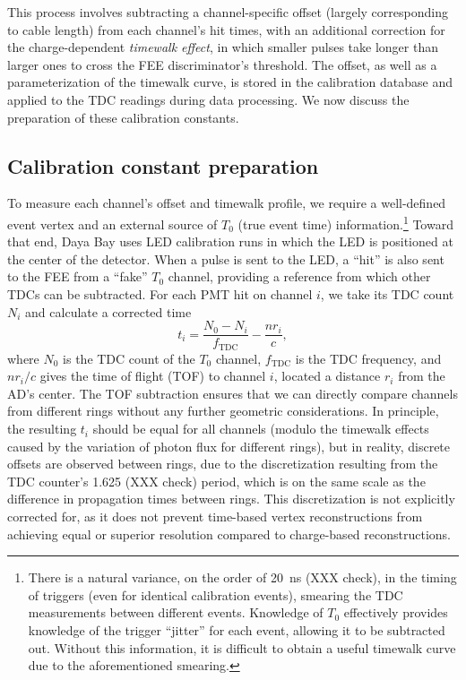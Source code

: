 \documentclass[../thesis.tex]{subfiles}
\begin{document}
This process involves subtracting a channel-specific offset (largely
corresponding to cable length) from each channel's hit times, with an additional
correction for the charge-dependent \emph{timewalk effect}, in which smaller
pulses take longer than larger ones to cross the FEE discriminator's
threshold. The offset, as well as a parameterization of the timewalk curve, is
stored in the calibration database and applied to the TDC readings during data
processing. We now discuss the preparation of these calibration constants.

\subsection{Calibration constant preparation}

To measure each channel's offset and timewalk profile, we require a well-defined
event vertex and an external source of $T_0$ (true event time)
information.\footnote{There is a natural variance, on the order of 20~ns (XXX
  check), in the timing of triggers (even for identical calibration events),
  smearing the TDC measurements between different events. Knowledge of $T_0$
  effectively provides knowledge of the trigger ``jitter'' for each event,
  allowing it to be subtracted out. Without this information, it is difficult to
  obtain a useful timewalk curve due to the aforementioned smearing.} Toward
that end, Daya Bay uses LED calibration runs in which the LED is positioned at
the center of the detector. When a pulse is sent to the LED, a ``hit'' is also
sent to the FEE from a ``fake'' $T_0$ channel, providing a reference from which
other TDCs can be subtracted. For each PMT hit on channel $i$, we take its TDC
count $N_i$ and calculate a corrected time
\begin{equation*}
  t_i = \frac{N_0 - N_i}{f_\mathrm{TDC}} - \frac{n r_i}{c},  
\end{equation*}
where $N_0$ is the TDC count of the $T_0$ channel, $f_\mathrm{TDC}$ is the TDC
frequency, and $nr_i/c$ gives the time of flight (TOF) to channel $i$, located a
distance $r_i$ from the AD's center. The TOF subtraction ensures that we can
directly compare channels from different rings without any further geometric
considerations. In principle, the resulting $t_i$ should be equal for all
channels (modulo the timewalk effects caused by the variation of photon flux for
different rings), but in reality, discrete offsets are observed between rings,
due to the discretization resulting from the TDC counter's 1.625 (XXX check)
period, which is on the same scale as the difference in propagation times
between rings. This discretization is not explicitly corrected for, as it does
not prevent time-based vertex reconstructions from achieving equal or superior
resolution compared to charge-based reconstructions.
\end{document}
